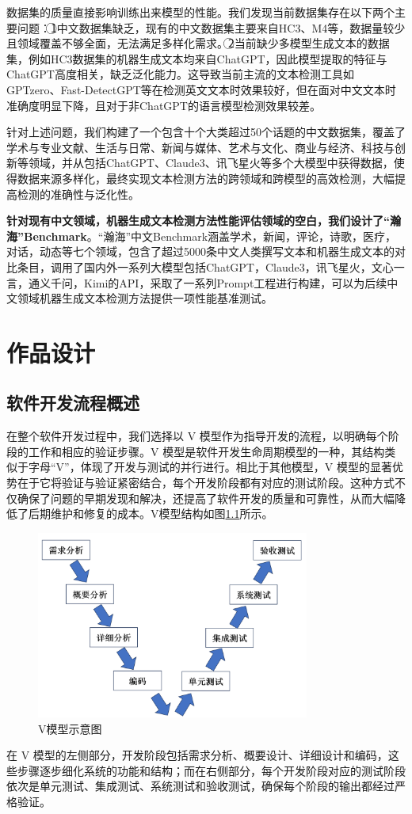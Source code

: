 \documentclass[a4paper]{report}
\begin{document}
数据集的质量直接影响训练出来模型的性能。我们发现当前数据集存在以下两个主要问题：\textcircled{1}中文数据集缺乏，现有的中文数据集主要来自HC3、M4等，数据量较少且领域覆盖不够全面，无法满足多样化需求。\textcircled{2}当前缺少多模型生成文本的数据集，例如HC3数据集的机器生成文本均来自ChatGPT，因此模型提取的特征与ChatGPT高度相关，缺乏泛化能力。这导致当前主流的文本检测工具如GPTzero、Fast-DetectGPT等在检测英文文本时效果较好，但在面对中文文本时准确度明显下降，且对于非ChatGPT的语言模型检测效果较差。

针对上述问题，我们构建了一个包含十个大类超过50个话题的中文数据集，覆盖了学术与专业文献、生活与日常、新闻与媒体、艺术与文化、商业与经济、科技与创新等领域，并从包括ChatGPT、Claude3、讯飞星火等多个大模型中获得数据，使得数据来源多样化，最终实现文本检测方法的跨领域和跨模型的高效检测，大幅提高检测的准确性与泛化性。

\textbf{针对现有中文领域，机器生成文本检测方法性能评估领域的空白，我们设计了“瀚海”Benchmark}。“瀚海”中文Benchmark涵盖学术，新闻，评论，诗歌，医疗，对话，动态等七个领域，包含了超过5000条中文人类撰写文本和机器生成文本的对比条目，调用了国内外一系列大模型包括ChatGPT，Claude3，讯飞星火，文心一言，通义千问，Kimi的API，采取了一系列Prompt工程进行构建，可以为后续中文领域机器生成文本检测方法提供一项性能基准测试。

\chapter{作品设计}
\section{软件开发流程概述}
在整个软件开发过程中，我们选择以 V 模型作为指导开发的流程，以明确每个阶段的工作和相应的验证步骤。V 模型是软件开发生命周期模型的一种，其结构类似于字母“V”，体现了开发与测试的并行进行。相比于其他模型，V 模型的显著优势在于它将验证与验证紧密结合，每个开发阶段都有对应的测试阶段。这种方式不仅确保了问题的早期发现和解决，还提高了软件开发的质量和可靠性，从而大幅降低了后期维护和修复的成本。V模型结构如图\ref{fig:V-Model}所示。
\begin{figure}[H]
	\centering
	\includegraphics[width=0.8\textwidth]{figures/V-Model.png}
	\caption{V模型示意图}
	\label{fig:V-Model}
\end{figure}
在 V 模型的左侧部分，开发阶段包括需求分析、概要设计、详细设计和编码，这些步骤逐步细化系统的功能和结构；而在右侧部分，每个开发阶段对应的测试阶段依次是单元测试、集成测试、系统测试和验收测试，确保每个阶段的输出都经过严格验证。
\end{document}
